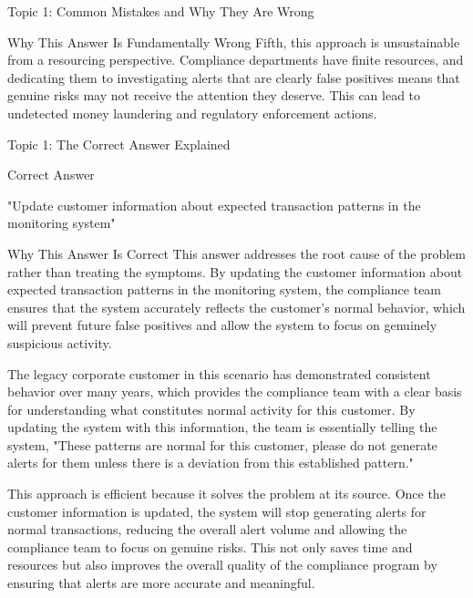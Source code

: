 \documentclass[8pt]{beamer}  %
\newcommand{\correct}{\textcolor{correctgreen}{\ding{51}}}
\begin{document}
\begin{frame}{Topic 1: Common Mistakes and Why They Are Wrong}
\begin{block}{\large Why This Answer Is Fundamentally Wrong}
			Fifth, this approach is unsustainable from a resourcing perspective. Compliance departments have finite resources, and dedicating them to investigating alerts that are clearly false positives means that genuine risks may not receive the attention they deserve. This can lead to undetected money laundering and regulatory enforcement actions.
		\end{block}
	\end{frame}
	
	\begin{frame}{Topic 1: The Correct Answer Explained}
		\begin{block}{\large \correct \textcolor{correctgreen}{Correct Answer}}
			\begin{center}
				\Large "Update customer information about expected transaction patterns in the monitoring system"
			\end{center}
		\end{block}
		
		\vspace{0.2cm}
		\begin{block}{\large Why This Answer Is Correct}
			This answer addresses the root cause of the problem rather than treating the symptoms. By updating the customer information about expected transaction patterns in the monitoring system, the compliance team ensures that the system accurately reflects the customer's normal behavior, which will prevent future false positives and allow the system to focus on genuinely suspicious activity.
			
			The legacy corporate customer in this scenario has demonstrated consistent behavior over many years, which provides the compliance team with a clear basis for understanding what constitutes normal activity for this customer. By updating the system with this information, the team is essentially telling the system, "These patterns are normal for this customer, please do not generate alerts for them unless there is a deviation from this established pattern."
			
			This approach is efficient because it solves the problem at its source. Once the customer information is updated, the system will stop generating alerts for normal transactions, reducing the overall alert volume and allowing the compliance team to focus on genuine risks. This not only saves time and resources but also improves the overall quality of the compliance program by ensuring that alerts are more accurate and meaningful.
			

\end{block}
\end{frame}
\end{document}
